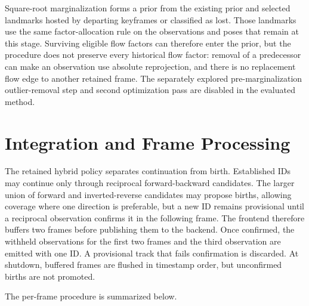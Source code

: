Square-root marginalization forms a prior from the existing prior and selected
landmarks hosted by departing keyframes or classified as lost. Those
landmarks use the same factor-allocation rule on the observations and poses
that remain at this stage. Surviving eligible flow factors can therefore enter
the prior, but the procedure does not preserve every historical flow factor:
removal of a predecessor can make an observation use absolute reprojection,
and there is no replacement flow edge to another retained frame. The
separately explored pre-marginalization outlier-removal step and second
optimization pass are disabled in the evaluated method.

\section{Integration and Frame Processing}

The retained hybrid policy separates continuation from birth. Established IDs
may continue only through reciprocal forward-backward candidates. The larger
union of forward and inverted-reverse candidates may propose births, allowing
coverage where one direction is preferable, but a new ID remains provisional
until a reciprocal observation confirms it in the following frame. The frontend
therefore buffers two frames before publishing them to the backend. Once
confirmed, the withheld observations for the first two frames and the third
observation are emitted with one ID. A provisional track that fails confirmation
is discarded. At shutdown, buffered frames are flushed in timestamp order, but
unconfirmed births are not promoted.

The per-frame procedure is summarized below.

